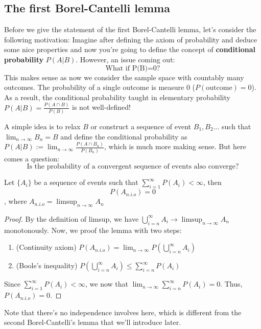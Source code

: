 \documentclass[11pt]{report}
\begin{document}
\subsection{The first Borel-Cantelli lemma}
Before we give the statement of the first Borel-Cantelli lemma, let's consider the following motivation:
Imagine after defining the axiom of probability and deduce some nice properties and now you're going to define the concept of {\bf conditional probability} $P(A|B)$. However, an issue coming out:
$$\mbox{What if P(B)=0?}$$
This makes sense as now we consider the sample space with countably many outcomes. The probability of a single outcome is measure 0 ($P(\mbox{outcome}) = 0$). As a result, the conditional probability taught in elementary probability $P(A|B) = \frac{P(A\cap B)}{P(B)}$ is not well-defined!

A simple idea is to relax $B$ or construct a sequence of event $B_1,B_2...$ such that $\lim_{n\rightarrow\infty}B_n = B$ and define the conditional probability as $P(A|B) := \lim_{n\rightarrow\infty}\frac{P(A\cap B_n)}{P(B_n)}$, which is much more making sense. But here comes a question:
$$\mbox{Is the probability of a convergent sequence of events also converge?}$$

\begin{theorem}
	\mbox{}
	
	Let $\{A_i\}$ be a sequence of events such that $\sum_{i=1}^{\infty}P(A_i)<\infty$, then
	$$P(A_{n.i.o}) = 0$$
	, where $A_{n.i.o} = \limsup_{n\rightarrow\infty}A_n$
\end{theorem}
\begin{proof}
	By the definition of limsup, we have $\bigcup_{i=n}^{\infty} A_i\rightarrow \limsup_{n\rightarrow\infty}A_n$ monotonously. Now, we proof the lemma with two steps:
	\begin{enumerate}
		\item (Continuity axiom) $P(A_{n.i.o}) = \lim_{n\rightarrow \infty}P(\bigcup_{i=n}^{\infty}A_i)$
		\item (Boole's inequality)  $P(\bigcup_{i=n}^{\infty}A_i)\leq\sum_{i=n}^{\infty}P(A_i)$
	\end{enumerate}
	Since $\sum_{i=1}^{\infty}P(A_i)<\infty$, we now that $\lim_{n\rightarrow\infty}\sum_{i=n}^{\infty}P(A_i)=0$. Thus, $P(A_{n.i.o})=0$.
\end{proof}

Note that there's no independence involves here, which is different from the second Borel-Cantelli's lemma that we'll introduce later.
\end{document}
